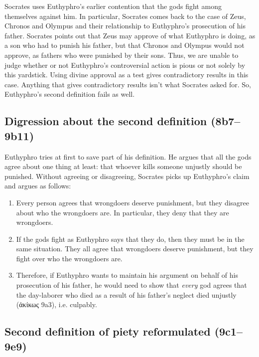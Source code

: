 \documentclass[11pt]{article}
\begin{document}
Socrates uses Euthyphro's earlier contention that the gods fight among
themselves against him.  In particular, Socrates comes back to the case of
Zeus, Chronos and Olympus and their relationship to Euthyphro's prosecution
of his father.  Socrates points out that Zeus may approve of what Euthyphro
is doing, as a son who had to punish his father, but that Chronos and
Olympus would not approve, as fathers who were punished by their sons.
Thus, we are unable to judge whether or not Euthyphro's controversial
action is pious or not solely by this yardstick.  Using divine approval as
a test gives contradictory results in this case.  Anything that gives
contradictory results isn't what Socrates asked for.  So, Euthyphro's
second definition fails as well.

\subsection{Digression about the second definition (8b7--9b11)}

Euthyphro tries at first to save part of his definition.  He argues that
all the gods agree about one thing at least: that whoever kills someone
unjustly should be punished.  Without agreeing or disagreeing, Socrates
picks up Euthyphro's claim and argues as follows:

\begin{enumerate}
    \item Every person agrees that wrongdoers deserve punishment, but they
        disagree about who the wrongdoers are.  In particular, they deny
        that they are wrongdoers.
    \item If the gods fight as Euthyphro says that they do, then they must
        be in the same situation.  They all agree that wrongdoers deserve
        punishment, but they fight over who the wrongdoers are.
    \item Therefore, if Euthyphro wants to maintain his argument on behalf
        of his prosecution of his father, he would need to show that
        \emph{every} god agrees that the day-laborer who died as a result
        of his father's neglect died unjustly (ἀκίκως 9a3), i.e. culpably.
\end{enumerate}

\subsection{Second definition of piety reformulated (9c1--9e9)}
\end{document}
